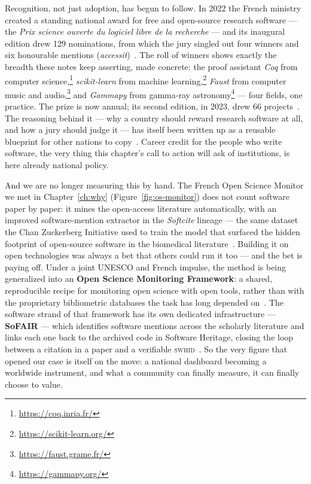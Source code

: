 Recognition, not just adoption, has begun to follow. In 2022 the French ministry created a standing
national award for free and open-source research software --- the \emph{Prix science ouverte du
logiciel libre de la recherche} --- and its inaugural edition drew 129 nominations, from which the
jury singled out four winners and six honourable mentions
(\emph{accessit})~\autocite{ResearchSoftwareAward2023}. The roll of winners shows exactly the breadth
these notes keep asserting, made concrete: the proof assistant \emph{Coq} from computer
science,\footnote{\url{https://coq.inria.fr/}} \emph{scikit-learn} from machine
learning,\footnote{\url{https://scikit-learn.org/}} \emph{Faust} from computer music and
audio,\footnote{\url{https://faust.grame.fr/}} and \emph{Gammapy} from gamma-ray
astronomy\footnote{\url{https://gammapy.org/}} --- four fields, one practice. The prize is now
annual; its second edition, in 2023, drew 66 projects~\autocite{PrixSwLibre2023}. The reasoning
behind it --- why a country should reward research software at all, and how a jury should judge it
--- has itself been written up as a reusable blueprint for other nations to
copy~\autocite{ResearchSoftwareAward2023}. Career credit for the people who write software, the very
thing this chapter's call to action will ask of institutions, is here already national policy.


And we are no longer measuring this by hand. The French Open Science Monitor we met in
Chapter~\ref{ch:why} (Figure~\ref{fig:os-monitor}) does not count software paper by paper: it mines
the open-access literature automatically, with an improved software-mention extractor in the
\emph{Softcite} lineage --- the same dataset the Chan Zuckerberg Initiative used to train the model
that surfaced the hidden footprint of open-source software in the biomedical
literature~\autocite{czi_oss_2022}. Building it on open technologies was always a bet that others
could run it too --- and the bet is paying off. Under a joint UNESCO and French impulse, the method
is being generalized into an \textbf{Open Science Monitoring Framework}: a shared, reproducible
recipe for monitoring open science with open tools, rather than with the proprietary bibliometric
databases the task has long depended on~\autocite{osmf_unesco_2023}. The software strand of that
framework has its own dedicated infrastructure --- \textbf{SoFAIR} --- which identifies software
mentions across the scholarly literature and links each one back to the archived code in Software
Heritage, closing the loop between a citation in a paper and a verifiable
\textsc{swhid}~\autocite{sofair2023}. So the very figure that opened our case is itself on the move:
a national dashboard becoming a worldwide instrument, and what a community can finally measure, it
can finally choose to value.

